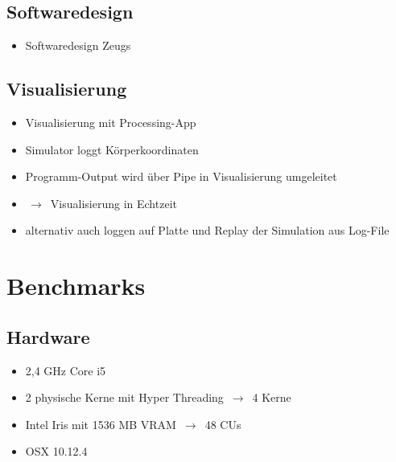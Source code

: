 \documentclass{beamer}
\begin{document}
\subsection{Softwaredesign}
\begin{frame}
\begin{itemize}
  \item Softwaredesign Zeugs
\end{itemize}
\end{frame}

\subsection{Visualisierung}
\begin{frame}
\begin{itemize}
  \item Visualisierung mit Processing-App
  \item Simulator loggt Körperkoordinaten
  \item Programm-Output wird über Pipe in Visualisierung umgeleitet
  \item $\,\to\,$ Visualisierung in Echtzeit
  \item alternativ auch loggen auf Platte und Replay der Simulation aus Log-File
\end{itemize}
\end{frame}

\section{Benchmarks}
\subsection{Hardware}
\begin{frame}
\begin{itemize}
  \item 2,4 GHz Core i5
  \item 2 physische Kerne mit Hyper Threading $\,\to\,$ 4 Kerne
  \item Intel Iris mit 1536 MB VRAM $\,\to\,$ 48 CUs
  \item OSX 10.12.4
\end{itemize}
\end{frame}
\end{document}
